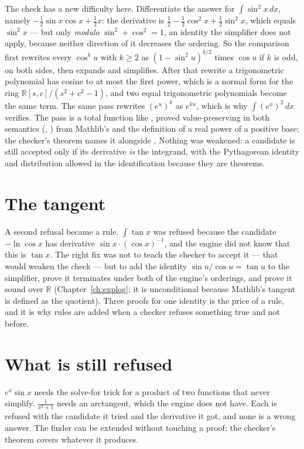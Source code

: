 The check has a new difficulty here. Differentiate the answer for $\int \sin^2 x\,dx$, namely
$-\frac{1}{2}\sin x \cos x + \frac{1}{2} x$: the derivative is $\frac{1}{2} - \frac{1}{2}\cos^2 x +
\frac{1}{2}\sin^2 x$, which equals $\sin^2 x$ --- but only \emph{modulo} $\sin^2 + \cos^2 = 1$, an
identity the simplifier does not apply, because neither direction of it decreases the ordering.
So the comparison first rewrites every $\cos^k u$ with $k \ge 2$ as $(1 - \sin^2 u)^{k/2}$ times
$\cos u$ if $k$ is odd, on both sides, then expands and simplifies. After that rewrite a
trigonometric polynomial has cosine to at most the first power, which is a normal form for the ring
$\mathbb{R}[s, c]/(s^2 + c^2 - 1)$, and two equal trigonometric polynomials become the same term.
The same pass rewrites $(e^u)^k$ as $e^{ku}$, which is why $\int (e^x)^2\,dx$ verifies. The pass
is a total function like , proved value-preserving in both semantics
(, ) from Mathlib's  and the
definition of a real power of a positive base; the checker's theorem names it alongside
. Nothing was weakened: a candidate is still accepted only if its derivative
\emph{is} the integrand, with the Pythagorean identity and distribution allowed in the
identification because they are theorems.

\section{The tangent}

A second refusal became a rule. $\int \tan x$ was refused because the candidate $-\ln \cos x$
has derivative $\sin x \cdot (\cos x)^{-1}$, and the engine did not know that this is $\tan x$.
The right fix was not to teach the checker to accept it --- that would weaken the check --- but to
add the identity $\sin u / \cos u = \tan u$ to the simplifier, prove it terminates under both of
the engine's orderings, and prove it sound over $\mathbb{R}$ (Chapter~\ref{ch:explog}: it is
unconditional because Mathlib's tangent is defined as the quotient). Three proofs for one
identity is the price of a rule, and it is why rules are added when a checker refuses something
true and not before.

\section{What is still refused}

$e^x \sin x$ needs the solve-for trick for a product of two functions that never simplify.
$\frac{1}{x^2 + 1}$ needs an arctangent, which the engine does not have. Each is refused with the candidate it tried and the derivative it got, and none is
a wrong answer. The finder can be extended without touching a proof; the checker's theorem
covers whatever it produces.

